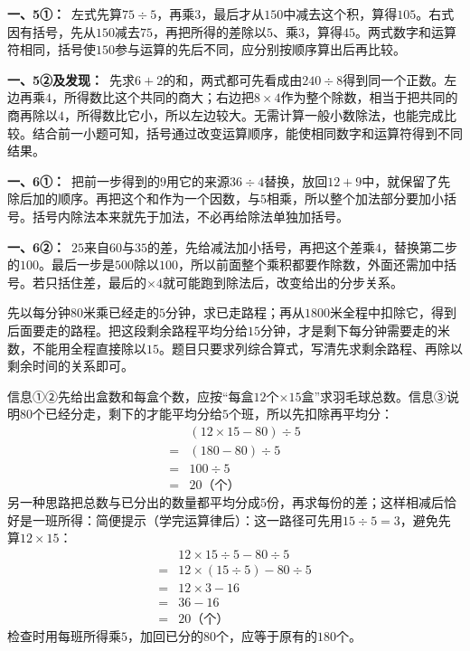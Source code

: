 \documentclass[multi=snippet,border=0pt]{standalone}
\newenvironment{snippet}[3]{\begin{minipage}{#1bp}\color{answerred}\fontsize{#2}{#3}\selectfont\raggedright}{\end{minipage}}
\begin{document}
\begin{snippet}{505}{11.5}{14}\textbf{一、5①：}\ 左式先算\(75\div5\)，再乘\(3\)，最后才从\(150\)中减去这个积，算得\(105\)。右式因有括号，先从\(150\)减去\(75\)，再把所得的差除以\(5\)、乘\(3\)，算得\(45\)。两式数字和运算符相同，括号使\(150\)参与运算的先后不同，应分别按顺序算出后再比较。\end{snippet}
\begin{snippet}{505}{11.5}{14}\textbf{一、5②及发现：}\ 先求\(6+2\)的和，两式都可先看成由\(240\div8\)得到同一个正数。左边再乘\(4\)，所得数比这个共同的商大；右边把\(8\times4\)作为整个除数，相当于把共同的商再除以\(4\)，所得数比它小，所以左边较大。无需计算一般小数除法，也能完成比较。结合前一小题可知，括号通过改变运算顺序，能使相同数字和运算符得到不同结果。\end{snippet}
\begin{snippet}{505}{11.5}{14}\textbf{一、6①：}\ 把前一步得到的\(9\)用它的来源\(36\div4\)替换，放回\(12+9\)中，就保留了先除后加的顺序。再把这个和作为一个因数，与\(5\)相乘，所以整个加法部分要加小括号。括号内除法本来就先于加法，不必再给除法单独加括号。\end{snippet}
\begin{snippet}{505}{11.5}{14}\textbf{一、6②：}\ \(25\)来自\(60\)与\(35\)的差，先给减法加小括号，再把这个差乘\(4\)，替换第二步的\(100\)。最后一步是\(500\)除以\(100\)，所以前面整个乘积都要作除数，外面还需加中括号。若只括住差，最后的\(\times4\)就可能跑到除法后，改变给出的分步关系。\end{snippet}
\begin{snippet}{505}{11.5}{14}先以每分钟\(80\)米乘已经走的\(5\)分钟，求已走路程；再从\(1800\)米全程中扣除它，得到后面要走的路程。把这段剩余路程平均分给\(15\)分钟，才是剩下每分钟需要走的米数，不能用全程直接除以\(15\)。题目只要求列综合算式，写清先求剩余路程、再除以剩余时间的关系即可。\end{snippet}
\begin{snippet}{505}{11.5}{14}信息①②先给出盒数和每盒个数，应按“每盒\(12\)个\(\times15\)盒”求羽毛球总数。信息③说明\(80\)个已经分走，剩下的才能平均分给\(5\)个班，所以先扣除再平均分：\[\begin{aligned}&(12\times15-80)\div5\\={}&(180-80)\div5\\={}&100\div5\\={}&20\text{（个）}\end{aligned}\]另一种思路把总数与已分出的数量都平均分成\(5\)份，再求每份的差；这样相减后恰好是一班所得：简便提示（学完运算律后）：这一路径可先用\(15\div5=3\)，避免先算\(12\times15\)：\[\begin{aligned}&12\times15\div5-80\div5\\={}&12\times(15\div5)-80\div5\\={}&12\times3-16\\={}&36-16\\={}&20\text{（个）}\end{aligned}\]检查时用每班所得乘\(5\)，加回已分的\(80\)个，应等于原有的\(180\)个。\end{snippet}
\end{document}
